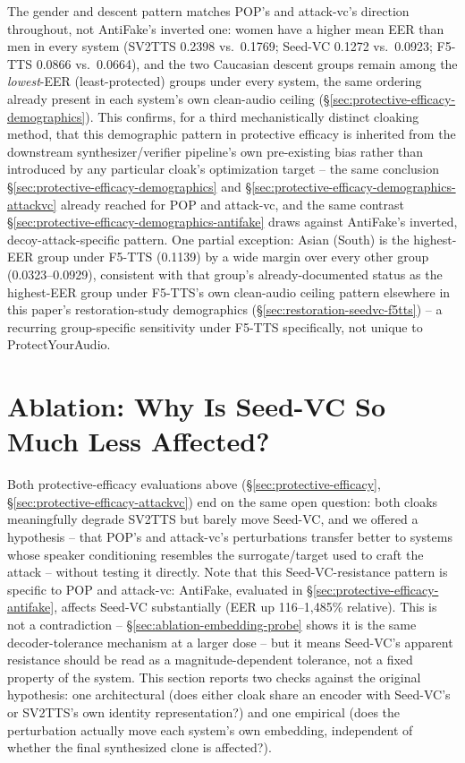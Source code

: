 \documentclass[11pt]{article}
\begin{document}
The gender and descent pattern matches POP's and attack-vc's direction
throughout, not AntiFake's inverted one: women have a higher mean EER
than men in every system (SV2TTS 0.2398 vs.\ 0.1769; Seed-VC 0.1272
vs.\ 0.0923; F5-TTS 0.0866 vs.\ 0.0664), and the two Caucasian descent
groups remain among the \emph{lowest}-EER (least-protected) groups
under every system, the same ordering already present in each system's
own clean-audio ceiling (\S\ref{sec:protective-efficacy-demographics}).
This confirms, for a third mechanistically distinct cloaking method,
that this demographic pattern in protective efficacy is inherited from
the downstream synthesizer/verifier pipeline's own pre-existing bias
rather than introduced by any particular cloak's optimization target --
the same conclusion \S\ref{sec:protective-efficacy-demographics} and
\S\ref{sec:protective-efficacy-demographics-attackvc} already reached
for POP and attack-vc, and the same contrast
\S\ref{sec:protective-efficacy-demographics-antifake} draws against
AntiFake's inverted, decoy-attack-specific pattern. One partial
exception: Asian (South) is the highest-EER group under F5-TTS
(0.1139) by a wide margin over every other group (0.0323--0.0929),
consistent with that group's already-documented status as the
highest-EER group under F5-TTS's own clean-audio ceiling pattern
elsewhere in this paper's restoration-study demographics
(\S\ref{sec:restoration-seedvc-f5tts}) -- a recurring group-specific
sensitivity under F5-TTS specifically, not unique to ProtectYourAudio.

\section{Ablation: Why Is Seed-VC So Much Less Affected?}
\label{sec:ablation-seedvc-mechanism}

Both protective-efficacy evaluations above (\S\ref{sec:protective-efficacy},
\S\ref{sec:protective-efficacy-attackvc}) end on the same open question:
both cloaks meaningfully degrade SV2TTS but barely move Seed-VC, and we
offered a hypothesis -- that POP's and attack-vc's perturbations
transfer better to systems whose speaker conditioning resembles the
surrogate/target used to craft the attack -- without testing it
directly. Note that this Seed-VC-resistance pattern is specific to POP
and attack-vc: AntiFake, evaluated in
\S\ref{sec:protective-efficacy-antifake}, affects Seed-VC substantially
(EER up 116--1{,}485\% relative). This is not a contradiction --
\S\ref{sec:ablation-embedding-probe} shows it is the same
decoder-tolerance mechanism at a larger dose -- but it means Seed-VC's
apparent resistance should be read as a magnitude-dependent tolerance,
not a fixed property of the system. This section reports two checks
against the original hypothesis:
one architectural (does either cloak share an encoder with Seed-VC's
or SV2TTS's own identity representation?) and one empirical (does the
perturbation actually move each system's own embedding, independent of
whether the final synthesized clone is affected?).
\end{document}
